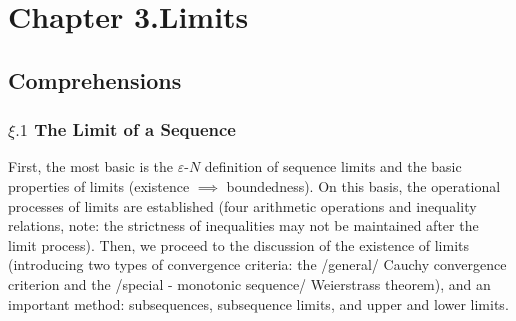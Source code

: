 

%


\newpage
\section{Chapter 3.Limits}
\subsection{Comprehensions}
\subsubsection{$\xi.1$ The Limit of a Sequence}
First, the most basic is the $\varepsilon$-$N$ definition of sequence limits and the basic properties of limits (existence $\implies$ boundedness). 
On this basis, the operational processes of limits are established (four arithmetic operations and inequality relations, note: the strictness of 
inequalities may not be maintained after the limit process). Then, we proceed to the discussion of the existence of limits (introducing two types 
of convergence criteria: the /general/ Cauchy convergence criterion and the /special - monotonic sequence/ Weierstrass theorem), and an important 
method: subsequences, subsequence limits, and upper and lower limits.

